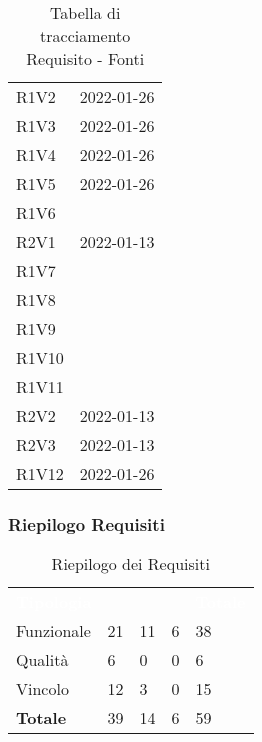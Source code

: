 \begin{table}[!htbp]
\begin{tabular}[t]{ m{}<{\centering}  m{}<{\centering} }
	R1V2 & \Ve{} 2022-01-26 \\	
	 
	R1V3 & \Ve{} 2022-01-26 \\	

	R1V4 & \Ve{} 2022-01-26 \\	
	 
	R1V5 & \Ve{} 2022-01-26 \\	
	 
	R1V6 & \Ca \\	
	 
	R2V1 & \Vi{} 2022-01-13 \\
	
	R1V7 & \Ca \\	
	 
	R1V8 & \Ca \\	 
	
	R1V9 & \Ca \\	
	
	R1V10 & \Ca \\
	
	R1V11 & \Ca \\

	R2V2 & \Vi{} 2022-01-13 \\	
	 
	R2V3 & \Vi{} 2022-01-13 \\	
	 
	R1V12 & \Ve{} 2022-01-26 \\	


\end{tabular}
\caption{Tabella di tracciamento Requisito - Fonti}
\end{table}

\subsubsection{Riepilogo Requisiti}

\begin{table}[!htbp]
\renewcommand{\arraystretch}{1.5}
\begin{tabular}{ m{}<{\centering}  m{}<{\centering}  m{}<{\centering}  m{}<{\centering}  m{}<{\centering} }
	\rowcolor{darkblue}
	\textcolor{white}{\textbf{Tipologia}} &\textcolor{white}{\textbf{\Ob}}& \textcolor{white}{\textbf{\De}} & \textcolor{white}{\textbf{\Fa}}&\textcolor{white}{\textbf{Totale}}\\ 
	Funzionale & 21 & 11 & 6 & 38\\	
	Qualità & 6 & 0 & 0 & 6 \\	
	Vincolo & 12 & 3 & 0 & 15 \\	
	\textbf{Totale} & 39 & 	14 & 6 & 59
\end{tabular}
\caption{Riepilogo dei Requisiti}
\end{table}